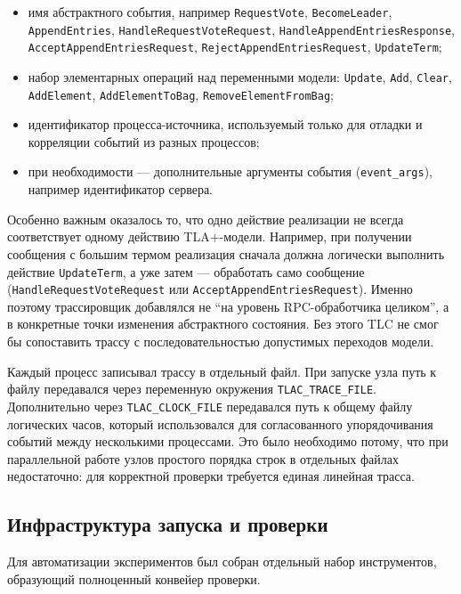 \begin{itemize}
    \item имя абстрактного события, например \texttt{RequestVote},
    \texttt{BecomeLeader}, \texttt{AppendEntries},
    \texttt{HandleRequestVoteRequest},
    \texttt{HandleAppendEntriesResponse},
    \texttt{AcceptAppendEntriesRequest},
    \texttt{RejectAppendEntriesRequest},
    \texttt{UpdateTerm};
    \item набор элементарных операций над переменными модели:
    \texttt{Update}, \texttt{Add}, \texttt{Clear},
    \texttt{AddElement}, \texttt{AddElementToBag},
    \texttt{RemoveElementFromBag};
    \item идентификатор процесса-источника, используемый только для отладки и
    корреляции событий из разных процессов;
    \item при необходимости --- дополнительные аргументы события
    (\texttt{event\_args}), например идентификатор сервера.
\end{itemize}

Особенно важным оказалось то, что одно действие реализации не всегда
соответствует одному действию TLA+-модели. Например, при получении сообщения с
большим термом реализация сначала должна логически выполнить действие
\texttt{UpdateTerm}, а уже затем --- обработать само сообщение
(\texttt{HandleRequestVoteRequest} или \texttt{AcceptAppendEntriesRequest}).
Именно поэтому трассировщик добавлялся не ``на уровень RPC-обработчика
целиком'', а в конкретные точки изменения абстрактного состояния. Без этого TLC
не смог бы сопоставить трассу с последовательностью допустимых переходов
модели.

Каждый процесс записывал трассу в отдельный файл. При запуске узла путь к
файлу передавался через переменную окружения \texttt{TLAC\_TRACE\_FILE}.
Дополнительно через \texttt{TLAC\_CLOCK\_FILE} передавался путь к общему
файлу логических часов, который использовался для согласованного упорядочивания
событий между несколькими процессами. Это было необходимо потому, что при
параллельной работе узлов простого порядка строк в отдельных файлах
недостаточно: для корректной проверки требуется единая линейная трасса.

\subsection{Инфраструктура запуска и проверки}

Для автоматизации экспериментов был собран отдельный набор инструментов,
образующий полноценный конвейер проверки.

